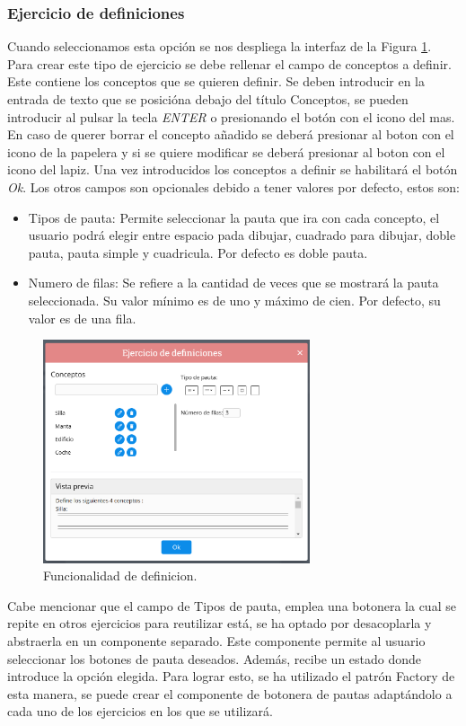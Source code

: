 \subsubsection{Ejercicio de definiciones}
Cuando seleccionamos esta opción se nos despliega la interfaz de la Figura \ref{fig:funcionalidadDefinicion}. Para crear este tipo de ejercicio se debe rellenar el campo de conceptos a definir. Este contiene los conceptos que se quieren definir. Se deben introducir en la entrada de texto que se posicióna debajo del título Conceptos, se pueden introducir al pulsar  la tecla \textit{ENTER} o presionando el botón con el icono del mas. En caso de querer borrar el concepto añadido se deberá presionar al boton con el icono de la papelera y si se quiere modificar se deberá presionar al boton con el icono del lapiz.
Una vez introducidos los conceptos a definir se habilitará el botón \textit{Ok}. Los otros campos son opcionales debido a tener valores por defecto, estos son:
\begin{itemize}
  \item Tipos de pauta: Permite seleccionar la pauta que ira con cada concepto, el usuario podrá elegir entre espacio pada dibujar, cuadrado para dibujar, doble pauta, pauta simple y cuadricula. Por defecto es doble pauta.
  \item Numero de filas: Se refiere a la cantidad de veces que se mostrará la pauta seleccionada. Su valor mínimo es de uno y máximo de cien. Por defecto, su valor es de una fila.
\end{itemize}
\begin{figure}[ht!]
  \centering
  \includegraphics[width=0.7\textwidth]{Imagenes/Funcionalidades/EjercicioDefinicion.png}
  \caption{Funcionalidad de definicion.}
  \label{fig:funcionalidadDefinicion}
\end{figure}
Cabe mencionar que el campo de Tipos de pauta, emplea una botonera la cual se repite en otros ejercicios para reutilizar está, se ha optado por desacoplarla y abstraerla en un componente separado. Este componente permite al usuario seleccionar los botones de pauta deseados. Además, recibe un estado donde introduce la opción elegida.
Para lograr esto, se ha utilizado el patrón Factory de esta manera, se puede crear el componente de botonera de pautas adaptándolo a cada uno de los ejercicios en los que se utilizará.

